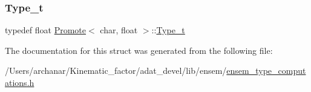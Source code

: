 \subsubsection{\texorpdfstring{Type\_t}{Type\_t}\hspace{0.1cm}{\footnotesize\ttfamily [2/2]}}
{\footnotesize\ttfamily typedef float \mbox{\hyperlink{structPromote}{Promote}}$<$ char, float $>$\+::\mbox{\hyperlink{structPromote_3_01char_00_01float_01_4_a1b84f2980103f92d2d15d421d34d78ea}{Type\+\_\+t}}}



The documentation for this struct was generated from the following file\+:\begin{DoxyCompactItemize}
\item 
/\+Users/archanar/\+Kinematic\+\_\+factor/adat\+\_\+devel/lib/ensem/\mbox{\hyperlink{lib_2ensem_2ensem__type__computations_8h}{ensem\+\_\+type\+\_\+computations.\+h}}\end{DoxyCompactItemize}
